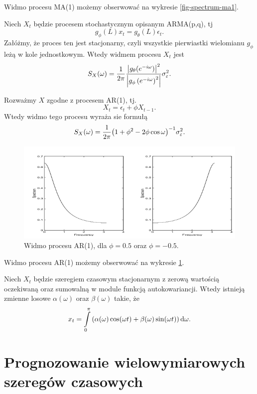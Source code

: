 \documentclass[10pt,a4paper]{book}
\begin{document}
Widmo procesu MA(1) możemy obserwować na wykresie \ref{fig-spectrum-ma1}.

\begin{theorem}
Niech $X_t$ będzie procesem stochastycznym opisanym ARMA(p,q), tj
$$
g_\phi(L) x_t = g_\theta(L) \epsilon_t.
$$
Załóżmy, że proces ten jest stacjonarny, czyli wszystkie pierwiastki wielomianu $g_\phi$ leżą w kole jednostkowym. Wtedy widmem procesu $X_t$ jest
$$
S_X (\omega) = \frac{1}{2 \pi} \frac{{\left| {g_\theta (e^{-i\omega})} \right|}^2}{ {\left| { {{g_\phi}\left( { e^{-i \omega} } \right)}^2} \right|} }\sigma^2_\varepsilon.
$$
\end{theorem}

\begin{theorem}
Rozważmy $X$ zgodne z procesem AR(1), tj.
$$
X_t = \epsilon_t + \phi X_{t-1}.
$$
Wtedy widmo tego procesu wyraża sie formułą
$$
S_X(\omega) = \frac{1}{2\pi} {\left( {1 + \phi^2 - 2 \phi \cos \omega} \right)}^{-1} \sigma_\varepsilon^2.
$$
\end{theorem}

\begin{figure}
\centering
\includegraphics[scale=0.6]{images/spectrumAR1.png}
\caption{Widmo procesu AR(1), dla $\phi = 0.5$ oraz $\phi= -0.5$.} \label{fig-spectrum-ar1}
\end{figure}

Widmo procesu AR(1) możemy obserwować na wykresie \ref{fig-spectrum-ar1}.

\begin{theorem}
Niech $X_t$ będzie szeregiem czasowym stacjonarnym z zerową wartością oczekiwaną oraz sumowalną w module funkcją autokowariancji. Wtedy istnieją zmienne losowe $\alpha(\omega)$ oraz $\beta(\omega)$ takie, że
$$
x_t = \int_{0}^\pi \bracket{\alpha(\omega) \cos (\omega t) + \beta(\omega) \sin(\omega t) } \dt[\omega].
$$ 
\end{theorem}

\chapter{Prognozowanie wielowymiarowych szeregów czasowych}
\end{document}
